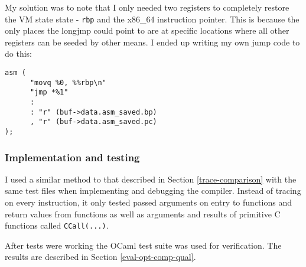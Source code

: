 My solution was to note that I only needed two registers to completely restore the VM state
state - \texttt{rbp} and the x86\_64 instruction pointer. This is because the only places the
longjmp could point to are at specific locations where all other registers can be seeded by other
means. I ended up writing my own jump code to do this:

\begin{verbatim}
asm (
      "movq %0, %%rbp\n"
      "jmp *%1"
      :
      : "r" (buf->data.asm_saved.bp)
      , "r" (buf->data.asm_saved.pc)
);
\end{verbatim}

\subsubsection{Implementation and testing}

I used a similar method to that described in Section \ref{trace-comparison} with the same test
files
when implementing and debugging the compiler. Instead of tracing on every instruction, it only
tested
passed arguments on entry to functions and return values from functions as well as arguments and
results of
primitive C functions called \texttt{CCall(...)}.

After tests were working the OCaml test suite was used for verification. The results are described
in Section
\ref{eval-opt-comp-qual}.

